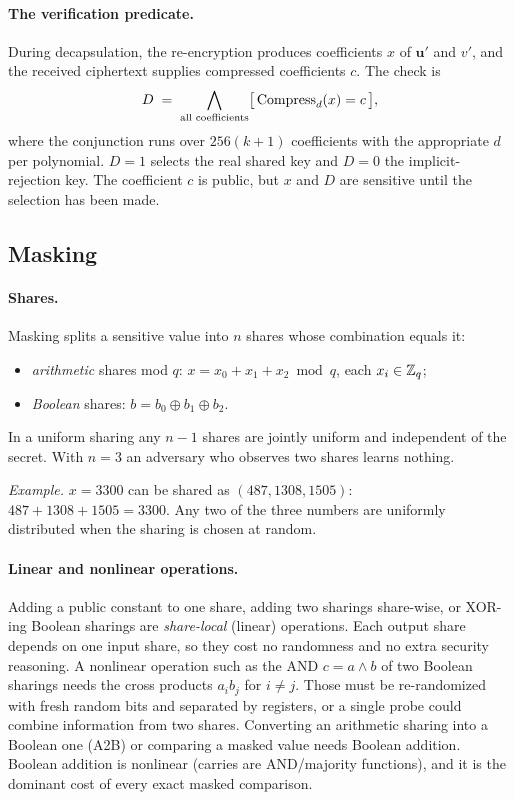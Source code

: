 \paragraph{The verification predicate.}
During decapsulation, the re-encryption produces coefficients $x$ of $\mathbf u'$ and $v'$, and the received ciphertext supplies compressed coefficients $c$. The check is
\begin{equation}\label{eq:pred}
  D \;=\; \bigwedge_{\text{all coefficients}} \bigl[\, \operatorname{Compress}_d(x) = c \,\bigr] ,
\end{equation}
where the conjunction runs over $256(k+1)$ coefficients with the appropriate $d$ per polynomial. $D = 1$ selects the real shared key and $D = 0$ the implicit-rejection key. The coefficient $c$ is public, but $x$ and $D$ are sensitive until the selection has been made.

\subsection{Masking}\label{sec:masking}
\paragraph{Shares.} Masking splits a sensitive value into $n$ shares whose combination equals it:
\begin{itemize}
  \item \emph{arithmetic} shares mod $q$: $x = x_0 + x_1 + x_2 \bmod q$, each $x_i \in \mathbb{Z}_q$;
  \item \emph{Boolean} shares: $b = b_0 \oplus b_1 \oplus b_2$.
\end{itemize}

In a uniform sharing any $n-1$ shares are jointly uniform and independent of the secret. With $n = 3$ an adversary who observes two shares learns nothing.

\emph{Example.} $x = 3300$ can be shared as $(487, 1308, 1505)$: $487 + 1308 + 1505 = 3300$. Any two of the three numbers are uniformly distributed when the sharing is chosen at random.

\paragraph{Linear and nonlinear operations.} Adding a public constant to one share, adding two sharings share-wise, or XOR-ing Boolean sharings are \emph{share-local} (linear) operations. Each output share depends on one input share, so they cost no randomness and no extra security reasoning. A nonlinear operation such as the AND $c = a \wedge b$ of two Boolean sharings needs the cross products $a_i b_j$ for $i \ne j$. Those must be re-randomized with fresh random bits and separated by registers, or a single probe could combine information from two shares. Converting an arithmetic sharing into a Boolean one (A2B) or comparing a masked value needs Boolean addition. Boolean addition is nonlinear (carries are AND/majority functions), and it is the dominant cost of every exact masked comparison.

